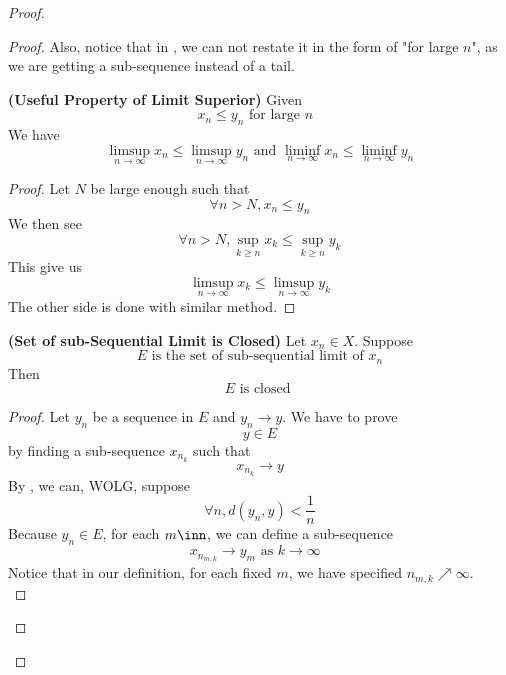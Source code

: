 \documentclass{report}
\begin{document}
\begin{proof}
\begin{proof}
{\begin{minipage}{39em}
Also, notice that in , we can not restate it in the form of "for large $n$", as we are getting a sub-sequence instead of a tail.
\end{minipage}}

\begin{theorem}
\label{4.4.8}
\textbf{(Useful Property of Limit Superior)} 
Given 
 \begin{equation*}
x_n\leq y_n\text{ for large $n$ }
\end{equation*}
We have 
\begin{equation*}
\limsup_{n\to\infty} x_n\leq \limsup_{n\to\infty} y_n\text{ and }\liminf_{n\to\infty} x_n\leq \liminf_{n\to\infty} y_n 
\end{equation*}
\end{theorem}
\begin{proof}
Let $N$ be large enough such that 
 \begin{equation*}
\forall n>N, x_n\leq y_n
\end{equation*}
We then see 
\begin{equation*}
\forall n>N, \sup_{k\geq n} x_k\leq \sup_{k\geq n}y_k
\end{equation*}
This give us 
\begin{equation*}
  \limsup_{n\to\infty} x_k\leq \limsup_{n\to\infty} y_k
\end{equation*}
The other side is done with similar method.
\end{proof}
\begin{theorem}
\label{4.4.9}
\textbf{(Set of sub-Sequential Limit is Closed)} Let $x_n\in X$. Suppose 
\begin{equation*}
E\text{ is the set of sub-sequential limit of $x_n$}
\end{equation*}
Then 
\begin{equation*}
E\text{ is closed }
\end{equation*}
\end{theorem}
\begin{proof}
Let $y_n$ be a sequence in $E$ and $y_n \to y$. We have to prove 
 \begin{equation*}
y \in E
\end{equation*}
by finding a sub-sequence $x_{n_k}$ such that 
\begin{equation*}
x_{n_k}\to y
\end{equation*}
By , we can, WOLG, suppose 
\begin{equation*}
\forall n,d(y_n,y)<\frac{1}{n}
\end{equation*}
Because $y_n\in E$, for each $m \inn$, we can define a sub-sequence  
 \begin{equation*}
x_{n_{m,k}}\to y_m\text{ as $k\to \infty$ }
\end{equation*}
Notice that in our definition, for each fixed $m$, we have specified $n_{m,k}\nearrow \infty$.\\


\end{proof}
\end{proof}
\end{proof}
\end{document}
